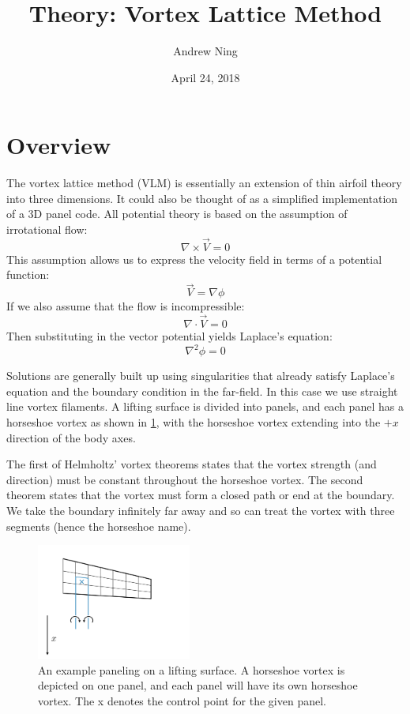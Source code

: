 \documentclass{article}
\begin{document}
\author{Andrew Ning}
\title{Theory: Vortex Lattice Method}
\date{April 24, 2018}
\maketitle

\section{Overview}

The vortex lattice method (VLM) is essentially an extension of thin airfoil theory into three dimensions.  It could also be thought of as a simplified implementation of a 3D panel code.  All potential theory is based on the assumption of irrotational flow: 
\begin{equation}
\nabla \times \vec{V} = 0
\end{equation}
This assumption allows us to express the velocity field in terms of a potential function:
\begin{equation}
\vec{V} = \nabla \phi
\end{equation}
If we also assume that the flow is incompressible:
\begin{equation}
\nabla \cdot \vec V = 0
\end{equation}
Then substituting in the vector potential yields Laplace's equation:
\begin{equation}
\nabla^2 \phi = 0
\end{equation}

Solutions are generally built up using singularities that already satisfy Laplace's equation and the boundary condition in the far-field.  In this case we use straight line vortex filaments.  A lifting surface is divided into panels, and each panel has a horseshoe vortex as shown in \cref{fig:horseshoe}, with the horseshoe vortex extending into the $+x$ direction of the body axes.  

The first of Helmholtz' vortex theorems states that the vortex strength (and direction) must be constant throughout the horseshoe vortex.  The second theorem states that the vortex must form a closed path or end at the boundary.  We take the boundary infinitely far away and so can treat the vortex with three segments (hence the horseshoe name).  

\begin{figure}[htbp]
\centering
\includegraphics[width=2.0in]{figs/horseshoe}
\caption{An example paneling on a lifting surface. A horseshoe vortex is depicted on one panel, and each panel will have its own horseshoe vortex.  The x denotes the control point for the given panel.}
\label{fig:horseshoe}
\end{figure}
\end{document}
